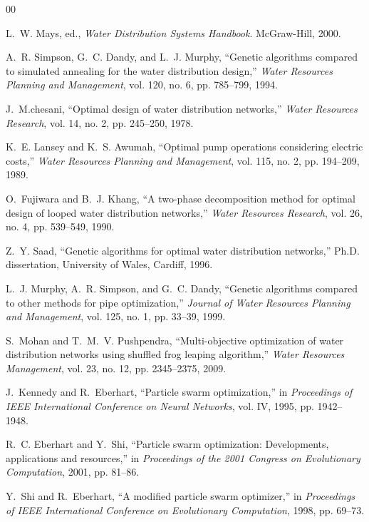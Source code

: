 \documentclass[conference]{IEEEtran}
\begin{document}
\begin{thebibliography}{00}

L.~W. Mays, ed., \emph{Water Distribution Systems Handbook}. McGraw-Hill, 2000.

A.~R. Simpson, G.~C. Dandy, and L.~J. Murphy, ``Genetic algorithms compared to simulated annealing for the water distribution design,'' \emph{Water Resources Planning and Management}, vol. 120, no. 6, pp. 785--799, 1994.

J.~M.chesani, ``Optimal design of water distribution networks,'' \emph{Water Resources Research}, vol. 14, no. 2, pp. 245--250, 1978.

K.~E. Lansey and K.~S. Awumah, ``Optimal pump operations considering electric costs,'' \emph{Water Resources Planning and Management}, vol. 115, no. 2, pp. 194--209, 1989.

O.~Fujiwara and B.~J. Khang, ``A two-phase decomposition method for optimal design of looped water distribution networks,'' \emph{Water Resources Research}, vol. 26, no. 4, pp. 539--549, 1990.

Z.~Y. Saad, ``Genetic algorithms for optimal water distribution networks,'' Ph.D. dissertation, University of Wales, Cardiff, 1996.

L.~J. Murphy, A.~R. Simpson, and G.~C. Dandy, ``Genetic algorithms compared to other methods for pipe optimization,'' \emph{Journal of Water Resources Planning and Management}, vol. 125, no. 1, pp. 33--39, 1999.

S.~Mohan and T.~M.~V. Pushpendra, ``Multi-objective optimization of water distribution networks using shuffled frog leaping algorithm,'' \emph{Water Resources Management}, vol. 23, no. 12, pp. 2345--2375, 2009.

J.~Kennedy and R.~Eberhart, ``Particle swarm optimization,'' in \emph{Proceedings of IEEE International Conference on Neural Networks}, vol. IV, 1995, pp. 1942--1948.

R.~C. Eberhart and Y.~Shi, ``Particle swarm optimization: Developments, applications and resources,'' in \emph{Proceedings of the 2001 Congress on Evolutionary Computation}, 2001, pp. 81--86.

Y.~Shi and R.~Eberhart, ``A modified particle swarm optimizer,'' in \emph{Proceedings of IEEE International Conference on Evolutionary Computation}, 1998, pp. 69--73.


\end{thebibliography}
\end{document}
